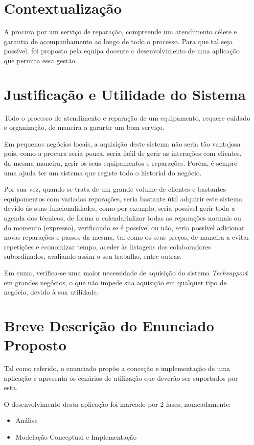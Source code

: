 \documentclass[a4paper,12pt]{scrreprt}
\begin{document}
\section{Contextualização}
A procura por um serviço de reparação, compreende um atendimento célere e garantia de acompanhamento ao longo de todo o processo.
Para que tal seja possível, foi proposto pela equipa docente o desenvolvimento de uma aplicação que permita essa gestão.

\section{Justificação e Utilidade do Sistema}

Todo o processo de atendimento e reparação de um equipamento, requere cuidado e organização, de maneira a garartir um bom serviço.

Em pequenos negócios locais, a aquisição deste sistema não seria tão vantajosa pois, como a procura seria pouca, seria faćil
de gerir as interações com clientes, da mesma maneira, gerir os seus equipamentos e reparações. Porém, é sempre uma ajuda ter um sistema que
registe todo o historial do negócio.

Por sua vez, quando se trata de um grande volume de clientes e bastantes equipamentos com variadas reparações, seria bastante útil adquirir este sistema 
devido às suas funcionalidades, como por exemplo, seria possível gerir toda a agenda dos técnicos, de forma a calendarializar todas as reparações normais ou do momento (expresso), 
verificando se é possível ou não, seria possível adicionar novas reparações e passos da mesma, tal como os seus preços, de maneira a evitar repetições e economizar tempo, aceder 
às listagens dos colaboradores subordinados, avaliando assim o seu trabalho, entre outras.

Em suma, verifica-se uma maior necessidade de aquisição do sistema \textit{Techsupport} em grandes negócios, o que não impede sua aquisição em qualquer tipo de negócio, 
devido à sua utilidade.

\section{Breve Descrição do Enunciado Proposto}

Tal como referido, o enunciado propõe a conceção e implementação de uma aplicação e apresenta os cenários de utilização que deverão ser
suportados por esta.

O desenvolvimento desta aplicação foi marcado por 2 fases, nomeadamente:
\begin{itemize}
    \item Análise
    \item Modelação Conceptual e Implementação
\end{itemize}
\end{document}
